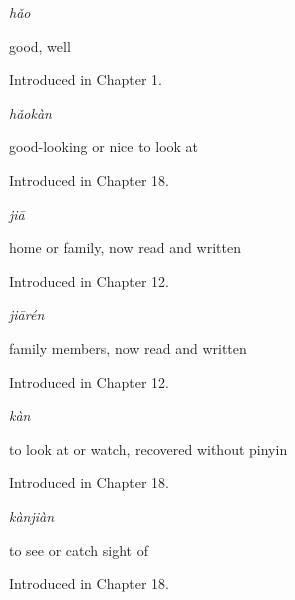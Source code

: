 \noindent\begin{minipage}[t]{\linewidth}
\raggedright
\textbf{}\enspace\emph{hǎo}\par
\small good, well\par
\footnotesize Introduced in Chapter 1.
\end{minipage}\par\medskip

\noindent\begin{minipage}[t]{\linewidth}
\raggedright
\textbf{}\enspace\emph{hǎokàn}\par
\small good-looking or nice to look at\par
\footnotesize Introduced in Chapter 18.
\end{minipage}\par\medskip

\noindent\begin{minipage}[t]{\linewidth}
\raggedright
\textbf{}\enspace\emph{jiā}\par
\small home or family, now read and written\par
\footnotesize Introduced in Chapter 12.
\end{minipage}\par\medskip

\noindent\begin{minipage}[t]{\linewidth}
\raggedright
\textbf{}\enspace\emph{jiārén}\par
\small family members, now read and written\par
\footnotesize Introduced in Chapter 12.
\end{minipage}\par\medskip

\noindent\begin{minipage}[t]{\linewidth}
\raggedright
\textbf{}\enspace\emph{kàn}\par
\small to look at or watch, recovered without pinyin\par
\footnotesize Introduced in Chapter 18.
\end{minipage}\par\medskip

\noindent\begin{minipage}[t]{\linewidth}
\raggedright
\textbf{}\enspace\emph{kànjiàn}\par
\small to see or catch sight of\par
\footnotesize Introduced in Chapter 18.
\end{minipage}\par\medskip

